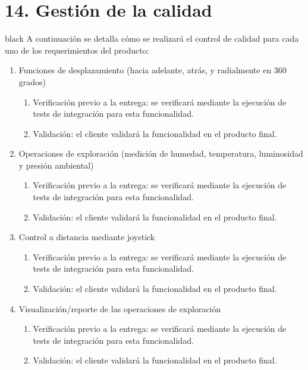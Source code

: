 \documentclass[
11pt, %
]{charter}
\begin{document}
\section{14. Gestión de la calidad}
\label{sec:calidad}
\begin{consigna}{black}
A continuación se detalla cómo se realizará el control de calidad para cada uno de los requerimientos del producto:
\begin{enumerate}	
			
		\item Funciones de desplazamiento (hacia adelante, atrás, y radialmente en 360 grados)
		\begin{enumerate}				
			\item Verificación previo a la entrega: se verificará mediante la ejecución de tests de integración para esta funcionalidad.			
			\item Validación: el cliente validará la funcionalidad en el producto final.			
		\end{enumerate}		
		
		\item Operaciones de exploración (medición de humedad, temperatura, luminosidad y presión ambiental)
		\begin{enumerate}				
			\item Verificación previo a la entrega: se verificará mediante la ejecución de tests de integración para esta funcionalidad.			
			\item Validación: el cliente validará la funcionalidad en el producto final.			
		\end{enumerate}		
	
		\item Control a distancia mediante joystick
		\begin{enumerate}				
			\item Verificación previo a la entrega: se verificará mediante la ejecución de tests de integración para esta funcionalidad.			
			\item Validación: el cliente validará la funcionalidad en el producto final.			
		\end{enumerate}			
	
		\item Visualización/reporte de las operaciones de exploración 
		\begin{enumerate}				
			\item Verificación previo a la entrega: se verificará mediante la ejecución de tests de integración para esta funcionalidad.			
			\item Validación: el cliente validará la funcionalidad en el producto final.			
		\end{enumerate}			
		

\end{enumerate}
\end{consigna}
\end{document}
